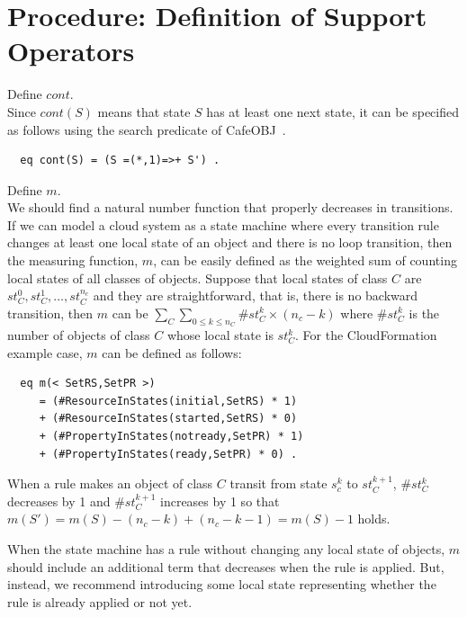 \documentclass[12pt]{report}
\newcommand{\cafeobj}{{\sf CafeOBJ}~}
\begin{document}
\section{Procedure: Definition of Support Operators}
\label{sec:support}
 Define $cont$. \\ Since $cont(S)$ means that
state $S$ has at least one next state, it can be specified as follows
using the search predicate of \cafeobj.
\begin{verbatim}
  eq cont(S) = (S =(*,1)=>+ S') .
\end{verbatim}
 Define $m$. \\ We should find a natural
number function that properly decreases in transitions. If we can
model a cloud system as a state machine where every transition rule
changes at least one local state of an object and there is no loop
transition, then the measuring function, $m$, can be easily defined as
the weighted sum of counting local states of all classes of objects.
Suppose that local states of class $C$ are $st_C^0, st_C^1, \dots ,
st_C^{n_c}$ and they are straightforward, that is, there is no
backward transition, then $m$ can be $\sum_{C} \sum_{0 \le k \le n_C}
\#st_C^k \times (n_c - k)$ where $\#st_C^k$ is the number of objects
of class $C$ whose local state is $st_C^k$. For the CloudFormation
example case, $m$ can be defined as follows:
\begin{verbatim}
  eq m(< SetRS,SetPR >)
     = (#ResourceInStates(initial,SetRS) * 1) 
     + (#ResourceInStates(started,SetRS) * 0)
     + (#PropertyInStates(notready,SetPR) * 1) 
     + (#PropertyInStates(ready,SetPR) * 0) .
\end{verbatim}
When a rule makes an object of class $C$ transit from state $s_c^k$ to
$st_C^{k+1}$, $\#st_C^k$ decreases by 1 and $\#st_C^{k+1}$ increases by 1 so that
$m(S')=m(S)-(n_c-k)+(n_c-k-1)=m(S)-1$ holds.

When the state machine has a rule without changing any local state
of objects, $m$ should include an additional term that decreases when
the rule is applied. But, instead, we recommend introducing some local
state representing whether the rule is already applied or not yet.
\end{document}
